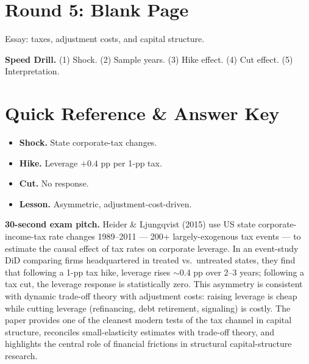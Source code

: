 \documentclass[11pt]{article}
\begin{document}
\section*{Round 5: Blank Page}
Essay: taxes, adjustment costs, and capital structure.

\vspace{6pt}
\begin{drillbox}
\textbf{Speed Drill.} (1) Shock. (2) Sample years. (3) Hike effect. (4) Cut effect. (5) Interpretation.
\end{drillbox}

\section*{Quick Reference \& Answer Key}
\begin{answerbox}
\begin{itemize}
\item \textbf{Shock.} State corporate-tax changes.
\item \textbf{Hike.} Leverage $+0.4$ pp per 1-pp tax.
\item \textbf{Cut.} No response.
\item \textbf{Lesson.} Asymmetric, adjustment-cost-driven.
\end{itemize}
\end{answerbox}

\begin{keybox}
\textbf{30-second exam pitch.} Heider \& Ljungqvist (2015) use US state corporate-income-tax rate changes 1989--2011 --- 200+ largely-exogenous tax events --- to estimate the causal effect of tax rates on corporate leverage. In an event-study DiD comparing firms headquartered in treated vs.\ untreated states, they find that following a 1-pp tax hike, leverage rises $\sim$0.4 pp over 2--3 years; following a tax cut, the leverage response is statistically zero. This asymmetry is consistent with dynamic trade-off theory with adjustment costs: raising leverage is cheap while cutting leverage (refinancing, debt retirement, signaling) is costly. The paper provides one of the cleanest modern tests of the tax channel in capital structure, reconciles small-elasticity estimates with trade-off theory, and highlights the central role of financial frictions in structural capital-structure research.
\end{keybox}
\end{document}
